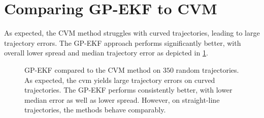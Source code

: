 \section{Comparing GP-EKF to CVM}
As expected, the CVM method struggles with curved trajectories, leading to large trajectory errors. The GP-EKF approach performs significantly better, with overall lower spread and median trajectory error as depicted in \cref{fig:stats_curved_gp_ekf_cvm}.
\begin{figure}[h]
    \centering
    \caption{GP-EKF compared to the CVM method on $350$ random trajectories. As expected, the \acrshort{cvm} yields large trajectory errors on curved trajectories. The GP-EKF performs consistently better, with lower median error as well as lower spread. However, on straight-line trajectories, the methods behave comparably.}
    \label{fig:stats_curved_gp_ekf_cvm}
\end{figure}

